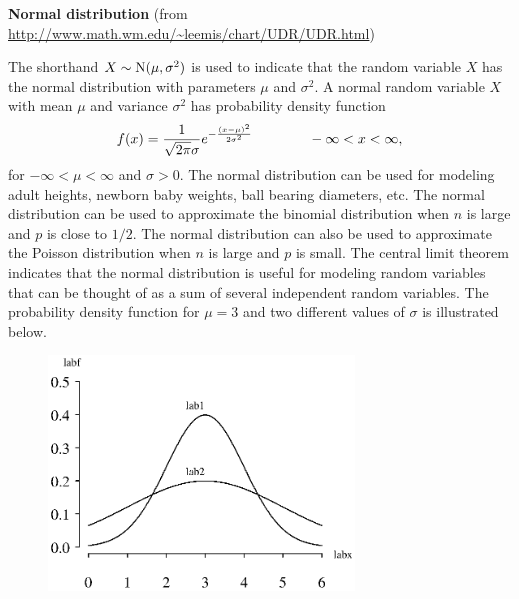\documentclass[12pt,fullpage]{article}
\begin{document}
\noindent
{\bf Normal distribution} (from \color{blue}\url{http://www.math.wm.edu/~leemis/chart/UDR/UDR.html}\color{black})

\noindent
The shorthand $X \sim {\rm N}(\mu, \sigma^2)$ is used to indicate that the
random variable $X$ has the normal distribution with parameters $\mu$ and $\sigma^2$.
A normal random variable $X$ with mean $\mu$ and variance $\sigma^2$ has probability density function 
$$
f(x) = \frac{1}{\sqrt{2 \pi} \sigma} e^{-{\frac { \left( x-{\it \mu} \right) ^{2}}{{{
2 \it \sigma}}^{2}}}} \qquad \qquad -\infty < x < \infty,
$$
for $-\infty < \mu < \infty$ and $\sigma >0$.
The normal distribution can be used for modeling adult heights, newborn baby weights, ball bearing
diameters, etc. 
The normal distribution can be used to approximate the binomial distribution when $n$ is large
and $p$ is close to $1/2$.
The normal distribution can also be used to approximate the Poisson distribution when $n$ is large
and $p$ is small. 
The central limit theorem indicates that the normal distribution is
useful for modeling random variables that can be thought of as a sum
of several independent random variables.
The probability density function for $\mu = 3$ and two different values of $\sigma$ is illustrated below.

{\begin{figure}[h!]
\begin{center}
\includegraphics[width=3.2in]{NormalPlot.ps}
\end{center}
\end{figure}}
\end{document}
